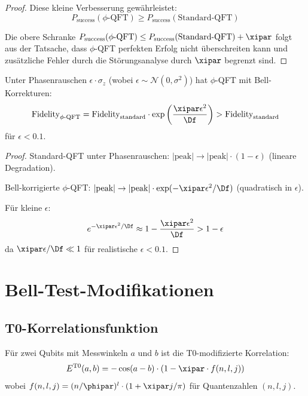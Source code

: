 \begin{proof}
	Diese kleine Verbesserung gewährleistet:
	\begin{equation}
		P_{\text{success}}(\text{$\phi$-QFT}) \geq P_{\text{success}}(\text{Standard-QFT})
	\end{equation}
	
	Die obere Schranke $P_{\text{success}}(\text{$\phi$-QFT}) \leq P_{\text{success}}(\text{Standard-QFT}) + \xipar$ folgt aus der Tatsache, dass $\phi$-QFT perfekten Erfolg nicht überschreiten kann und zusätzliche Fehler durch die Störungsanalyse durch $\xipar$ begrenzt sind.
\end{proof}

\begin{corollary}[Dekohärenzunterdrückung]
	\label{cor:stability}
	Unter Phasenrauschen $\epsilon \cdot \sigma_z$ (wobei $\epsilon \sim \mathcal{N}(0, \sigma^2)$) hat $\phi$-QFT mit Bell-Korrekturen:
	\begin{equation}
		\text{Fidelity}_{\text{$\phi$-QFT}} = \text{Fidelity}_{\text{standard}} \cdot \exp\left(\frac{\xipar \epsilon^2}{\Df}\right) > \text{Fidelity}_{\text{standard}}
	\end{equation}
	für $\epsilon < 0.1$.
\end{corollary}

\begin{proof}
	Standard-QFT unter Phasenrauschen: $|\text{peak}| \to |\text{peak}| \cdot (1 - \epsilon)$ (lineare Degradation).
	
	Bell-korrigierte $\phi$-QFT: $|\text{peak}| \to |\text{peak}| \cdot \exp(-\xipar\epsilon^2/\Df)$ (quadratisch in $\epsilon$).
	
	Für kleine $\epsilon$:
	\begin{equation}
		e^{-\xipar\epsilon^2/\Df} \approx 1 - \frac{\xipar\epsilon^2}{\Df} > 1 - \epsilon
	\end{equation}
	da $\xipar\epsilon/\Df \ll 1$ für realistische $\epsilon < 0.1$.
\end{proof}

\section{Bell-Test-Modifikationen}
\label{sec:bell}

\subsection{T0-Korrelationsfunktion}

\begin{definition}
	Für zwei Qubits mit Messwinkeln $a$ und $b$ ist die T0-modifizierte Korrelation:
	\begin{equation}
		E^{\text{T0}}(a,b) = -\cos(a-b) \cdot \left(1 - \xipar \cdot f(n,l,j)\right)
		\label{eq:t0bell}
	\end{equation}
	wobei $f(n,l,j) = (n/\phipar)^l \cdot (1 + \xipar j/\pi)$ für Quantenzahlen $(n,l,j)$.
\end{definition}

